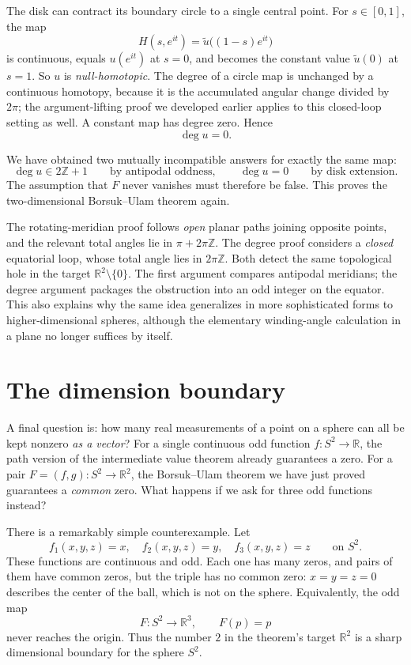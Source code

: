 The disk can contract its boundary circle to a single central point. For \(s\in[0,1]\), the map
\[
 H(s,e^{it})=\widetilde u\bigl((1-s)e^{it}\bigr)
\]
is continuous, equals \(u(e^{it})\) at \(s=0\), and becomes the constant value \(\widetilde u(0)\) at \(s=1\). So \(u\) is \emph{null-homotopic}. The degree of a circle map is unchanged by a continuous homotopy, because it is the accumulated angular change divided by \(2\pi\); the argument-lifting proof we developed earlier applies to this closed-loop setting as well. A constant map has degree zero. Hence
\[
 \deg u=0.
\]

We have obtained two mutually incompatible answers for exactly the same map:
\[
 \deg u\in2\mathbb Z+1
 \qquad\text{by antipodal oddness},\qquad
 \deg u=0
 \qquad\text{by disk extension}.
\]
The assumption that \(F\) never vanishes must therefore be false. This proves the two-dimensional Borsuk--Ulam theorem again.

The rotating-meridian proof follows \emph{open} planar paths joining opposite points, and the relevant total angles lie in \(\pi+2\pi\mathbb Z\). The degree proof considers a \emph{closed} equatorial loop, whose total angle lies in \(2\pi\mathbb Z\). Both detect the same topological hole in the target \(\mathbb R^2\setminus\{0\}\). The first argument compares antipodal meridians; the degree argument packages the obstruction into an odd integer on the equator. This also explains why the same idea generalizes in more sophisticated forms to higher-dimensional spheres, although the elementary winding-angle calculation in a plane no longer suffices by itself.

\section{The dimension boundary}

A final question is: how many real measurements of a point on a sphere can all be kept nonzero \emph{as a vector}? For a single continuous odd function \(f:S^2\to\mathbb R\), the path version of the intermediate value theorem already guarantees a zero. For a pair \(F=(f,g):S^2\to\mathbb R^2\), the Borsuk--Ulam theorem we have just proved guarantees a \emph{common} zero. What happens if we ask for three odd functions instead?

There is a remarkably simple counterexample. Let
\[
 f_1(x,y,z)=x,\quad
 f_2(x,y,z)=y,\quad
 f_3(x,y,z)=z
 \qquad\text{on }S^2.
\]
These functions are continuous and odd. Each one has many zeros, and pairs of them have common zeros, but the triple has no common zero: \(x=y=z=0\) describes the center of the ball, which is not on the sphere. Equivalently, the odd map
\[
 F:S^2\longrightarrow\mathbb R^3,\qquad F(p)=p
\]
never reaches the origin. Thus the number \(2\) in the theorem's target \(\mathbb R^2\) is a sharp dimensional boundary for the sphere \(S^2\).

